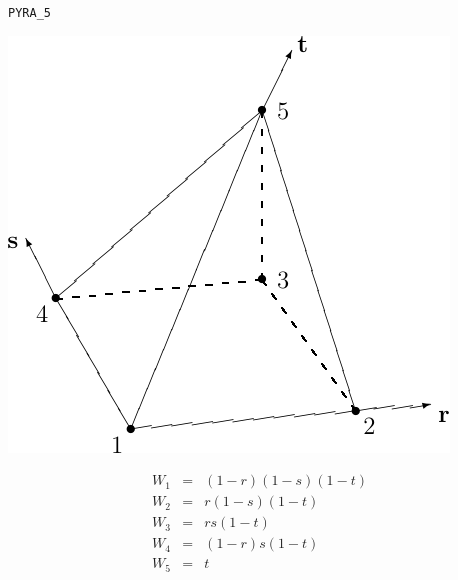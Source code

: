 \newpage
\texttt{PYRA\_5}\\[-2\baselineskip]
\begin{center}
\begin{minipage}[t]{0.5\linewidth}
   \centering
   \vspace{0pt}
   \includegraphics{cnct.figs/cnct_unst_pyra5}
\end{minipage}%
\begin{minipage}[t]{0.5\linewidth}
   \vspace{-\abovedisplayskip}
   \begin{eqnarray*}
      W_1 &=& (1-r)(1-s)(1-t) \\
      W_2 &=& r(1-s)(1-t) \\
      W_3 &=& rs(1-t) \\
      W_4 &=& (1-r)s(1-t) \\
      W_5 &=& t
   \end{eqnarray*}
\end{minipage}
\end{center}

